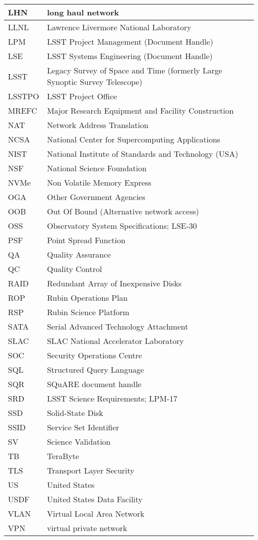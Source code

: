 \begin{longtable}{p{}p{}}
LHN & long haul network \\\hline
LLNL & Lawrence Livermore National Laboratory \\\hline
LPM & LSST Project Management (Document Handle) \\\hline
LSE & LSST Systems Engineering (Document Handle) \\\hline
LSST & Legacy Survey of Space and Time (formerly Large Synoptic Survey Telescope) \\\hline
LSSTPO & LSST Project Office \\\hline
MREFC & Major Research Equipment and Facility Construction \\\hline
NAT & Network Address Translation \\\hline
NCSA & National Center for Supercomputing Applications \\\hline
NIST & National Institute of Standards and Technology (USA) \\\hline
NSF & National Science Foundation \\\hline
NVMe & Non Volatile Memory Express \\\hline
OGA & Other Government Agencies \\\hline
OOB & Out Of Bound (Alternative network access) \\\hline
OSS & Observatory System Specifications; LSE-30 \\\hline
PSF & Point Spread Function \\\hline
QA & Quality Assurance \\\hline
QC & Quality Control \\\hline
RAID & Redundant Array of Inexpensive Disks \\\hline
ROP & Rubin Operations Plan \\\hline
RSP & Rubin Science Platform \\\hline
SATA & Serial Advanced Technology Attachment \\\hline
SLAC & SLAC National Accelerator Laboratory \\\hline
SOC & Security Operations Centre \\\hline
SQL & Structured Query Language \\\hline
SQR & SQuARE document handle \\\hline
SRD & LSST Science Requirements; LPM-17 \\\hline
SSD & Solid-State Disk \\\hline
SSID & Service Set Identifier \\\hline
SV & Science Validation \\\hline
TB & TeraByte \\\hline
TLS & Transport Layer Security \\\hline
US & United States \\\hline
USDF & United States Data Facility \\\hline
VLAN &  Virtual Local Area Network \\\hline
VPN & virtual private network \\\hline
\end{longtable}
